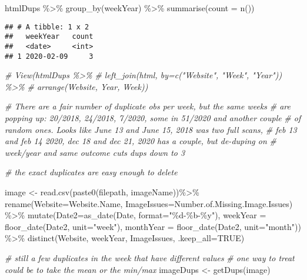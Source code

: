 \documentclass[
]{article}
\newenvironment{Shaded}{\begin{snugshade}}{\end{snugshade}}
\newcommand{\AttributeTok}[1]{\textcolor[rgb]{0.77,0.63,0.00}{#1}}
\newcommand{\CommentTok}[1]{\textcolor[rgb]{0.56,0.35,0.01}{\textit{#1}}}
\newcommand{\ConstantTok}[1]{\textcolor[rgb]{0.00,0.00,0.00}{#1}}
\newcommand{\FunctionTok}[1]{\textcolor[rgb]{0.00,0.00,0.00}{#1}}
\newcommand{\NormalTok}[1]{#1}
\newcommand{\OtherTok}[1]{\textcolor[rgb]{0.56,0.35,0.01}{#1}}
\newcommand{\SpecialCharTok}[1]{\textcolor[rgb]{0.00,0.00,0.00}{#1}}
\newcommand{\StringTok}[1]{\textcolor[rgb]{0.31,0.60,0.02}{#1}}
\begin{document}
\begin{Shaded}
\begin{Highlighting}[]
\NormalTok{htmlDups }\SpecialCharTok{\%\textgreater{}\%} \FunctionTok{group\_by}\NormalTok{(weekYear) }\SpecialCharTok{\%\textgreater{}\%} \FunctionTok{summarise}\NormalTok{(}\AttributeTok{count =} \FunctionTok{n}\NormalTok{())}
\end{Highlighting}
\end{Shaded}

\begin{verbatim}
## # A tibble: 1 x 2
##   weekYear   count
##   <date>     <int>
## 1 2020-02-09     3
\end{verbatim}

\begin{Shaded}
\begin{Highlighting}[]
\CommentTok{\# View(htmlDups \%\textgreater{}\%}
\CommentTok{\#   left\_join(html, by=c("Website", "Week", "Year")) \%\textgreater{}\%}
\CommentTok{\#   arrange(Website, Year, Week))}


\CommentTok{\# There are a fair number of duplicate obs per week, but the same weeks}
\CommentTok{\# are popping up: 20/2018, 24/2018, 7/2020, some in 51/2020 and another couple}
\CommentTok{\# of random ones. Looks like June 13 and June 15, 2018 was two full scans, }
\CommentTok{\# feb 13 and feb 14 2020, dec 18 and dec 21, 2020 has a couple, but de{-}duping on }
\CommentTok{\# week/year and same outcome cuts dups down to 3}


\CommentTok{\# the exact duplicates are easy enough to delete}

\NormalTok{image }\OtherTok{\textless{}{-}} \FunctionTok{read.csv}\NormalTok{(}\FunctionTok{paste0}\NormalTok{(filepath, imageName))}\SpecialCharTok{\%\textgreater{}\%}
  \FunctionTok{rename}\NormalTok{(}\AttributeTok{Website=}\NormalTok{Website.Name, }\AttributeTok{ImageIssues=}\NormalTok{Number.of.Missing.Image.Issues) }\SpecialCharTok{\%\textgreater{}\%}
  \FunctionTok{mutate}\NormalTok{(}\AttributeTok{Date2=}\FunctionTok{as\_date}\NormalTok{(Date, }\AttributeTok{format=}\StringTok{"\%d{-}\%b{-}\%y"}\NormalTok{),}
    \AttributeTok{weekYear =} \FunctionTok{floor\_date}\NormalTok{(Date2, }\AttributeTok{unit=}\StringTok{"week"}\NormalTok{),}
    \AttributeTok{monthYear =} \FunctionTok{floor\_date}\NormalTok{(Date2, }\AttributeTok{unit=}\StringTok{"month"}\NormalTok{)) }\SpecialCharTok{\%\textgreater{}\%}
  \FunctionTok{distinct}\NormalTok{(Website, weekYear, ImageIssues, }\AttributeTok{.keep\_all=}\ConstantTok{TRUE}\NormalTok{)}

\CommentTok{\# still a few duplicates in the week that have different values}
\CommentTok{\# one way to treat could be to take the mean or the min/max}
\NormalTok{imageDups }\OtherTok{\textless{}{-}} \FunctionTok{getDups}\NormalTok{(image)}
\end{Highlighting}
\end{Shaded}
\end{document}
